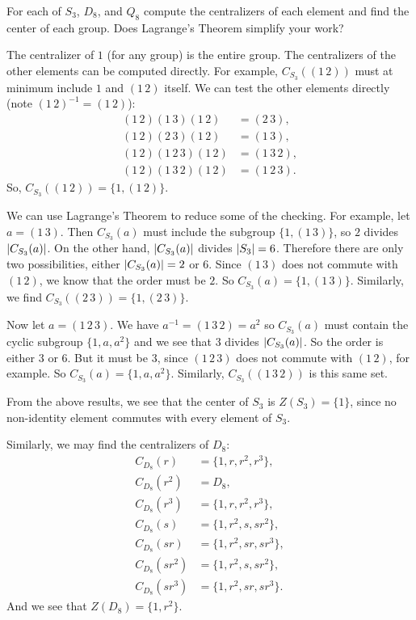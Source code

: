  For each of $S_3$, $D_8$, and $Q_8$ compute the
centralizers of each element and find the center of each group. Does
Lagrange's Theorem simplify your work?
\begin{solution}
  The centralizer of $1$ (for any group) is the entire group. The
  centralizers of the other elements can be computed directly. For
  example, $C_{S_3}((1\,2))$ must at minimum include $1$ and $(1\,2)$
  itself. We can test the other elements directly (note
  $(1\,2)^{-1} = (1\,2)$):
  \begin{align*}
    (1\,2)(1\,3)(1\,2) &= (2\,3), \\
    (1\,2)(2\,3)(1\,2) &= (1\,3), \\
    (1\,2)(1\,2\,3)(1\,2) &= (1\,3\,2), \\
    (1\,2)(1\,3\,2)(1\,2) &= (1\,2\,3).
  \end{align*}
  So, $C_{S_3}((1\,2)) = \{ 1, (1\,2) \}$.

  We can use Lagrange's Theorem to reduce some of the checking. For
  example, let $a = (1\,3)$. Then $C_{S_3}(a)$ must include the
  subgroup $\{1, (1\,3)\}$, so $2$ divides $\lvert{C_{S_3}(a)}\rvert$. On the
  other hand, $\lvert{C_{S_3}(a)}\rvert$ divides $\lvert{S_3}\rvert = 6$. Therefore
  there are only two possibilities, either $\lvert{C_{S_3}(a)}\rvert = 2$ or
  $6$. Since $(1\,3)$ does not commute with $(1\,2)$, we know that the
  order must be $2$. So $C_{S_3}(a) = \{ 1, (1\,3) \}$. Similarly, we
  find $C_{S_3}((2\,3)) = \{ 1, (2\,3) \}$.

  Now let $a = (1\,2\,3)$. We have $a^{-1} = (1\,3\,2) = a^2$ so
  $C_{S_3}(a)$ must contain the cyclic subgroup $\{1, a, a^2\}$ and we
  see that $3$ divides $\lvert{C_{S_3}(a)}\rvert$. So the order is either $3$
  or $6$. But it must be $3$, since $(1\,2\,3)$ does not commute with
  $(1\,2)$, for example. So $C_{S_3}(a) = \{1, a, a^2\}$. Similarly,
  $C_{S_3}((1\,3\,2))$ is this same set.

  From the above results, we see that the center of $S_3$ is
  $Z(S_3) = \{1\}$, since no non-identity element commutes with every
  element of $S_3$.

  Similarly, we may find the centralizers of $D_8$:
  \begin{align*}
    C_{D_8}(r) &= \{1, r, r^2, r^3\}, \\
    C_{D_8}(r^2) &= D_8, \\
    C_{D_8}(r^3) &= \{1, r, r^2, r^3\}, \\
    C_{D_8}(s) &= \{1, r^2, s, sr^2\}, \\
    C_{D_8}(sr) &= \{1, r^2, sr, sr^3\}, \\
    C_{D_8}(sr^2) &= \{1, r^2, s, sr^2\}, \\
    C_{D_8}(sr^3) &= \{1, r^2, sr, sr^3\}.
  \end{align*}
  And we see that $Z(D_8) = \{1, r^2\}$.


\end{solution}
